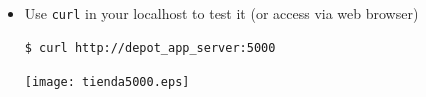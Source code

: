 \documentclass{beamer}
\begin{document}
\begin{frame}
\begin{itemize}
\begin{block}{Warning!}
  Remember that localhost is ``perdidita''
\end{block}

\item Use \texttt{curl} in your \alert{localhost} to test it (or access via web browser)

\begin{lstlisting}[escapechar=&]
$ curl http://depot_app_server:5000
\end{lstlisting}


\texttt{[image: tienda5000.eps]}

\end{itemize}

\end{frame}

\end{document}
